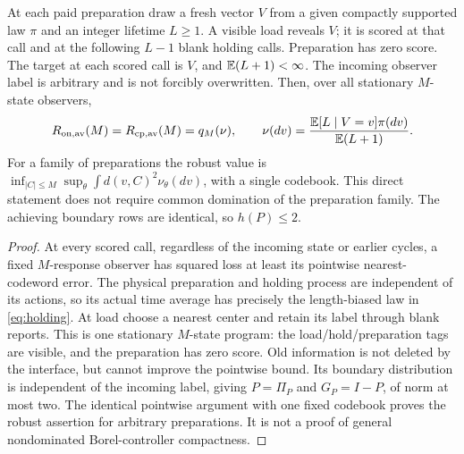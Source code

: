 \begin{proposition}\label{prop:holding}
At each paid preparation draw a fresh vector $V$ from a given compactly supported law $\pi$ and an integer lifetime $L\ge1$. A visible load reveals $V$; it is scored at that call and at the following $L-1$ blank holding calls. Preparation has zero score. The target at each scored call is $V$, and $\mathbb E(L+1)<\infty$. The incoming observer label is arbitrary and is not forcibly overwritten. Then, over all stationary $M$-state observers,
\begin{equation}\label{eq:holding}
 R_{\rm on,\mathrm{av}}(M)=R_{\rm cp,\mathrm{av}}(M)=q_M(\nu),\qquad
 \nu(dv)={\mathbb E[L\mid V=v]\pi(dv)\over\mathbb E(L+1)}.
\end{equation}
For a family of preparations the robust value is $\inf_{|C|\le M}\sup_\theta\int d(v,C)^2\nu_\theta(dv)$, with a single codebook. This direct statement does not require common domination of the preparation family. The achieving boundary rows are identical, so $h(P)\le2$.
\end{proposition}
\begin{proof}
At every scored call, regardless of the incoming state or earlier cycles, a fixed $M$-response observer has squared loss at least its pointwise nearest-codeword error. The physical preparation and holding process are independent of its actions, so its actual time average has precisely the length-biased law in \eqref{eq:holding}. At load choose a nearest center and retain its label through blank reports. This is one stationary $M$-state program: the load/hold/preparation tags are visible, and the preparation has zero score. Old information is not deleted by the interface, but cannot improve the pointwise bound. Its boundary distribution is independent of the incoming label, giving $P=\Pi_P$ and $G_P=I-P$, of norm at most two. The identical pointwise argument with one fixed codebook proves the robust assertion for arbitrary preparations. It is not a proof of general nondominated Borel-controller compactness.
\end{proof}
